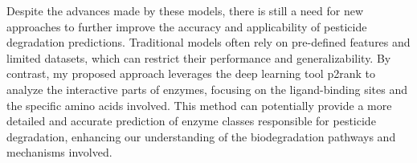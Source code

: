 Despite the advances made by these models, there is still a need for new approaches to further improve the accuracy and applicability of pesticide degradation predictions. Traditional models often rely on pre-defined features and limited datasets, which can restrict their performance and generalizability. By contrast, my proposed approach leverages the deep learning tool p2rank to analyze the interactive parts of enzymes, focusing on the ligand-binding sites and the specific amino acids involved. \autocite{krivakP2RankMachineLearning2018} This method can potentially provide a more detailed and accurate prediction of enzyme classes responsible for pesticide degradation, enhancing our understanding of the biodegradation pathways and mechanisms involved.